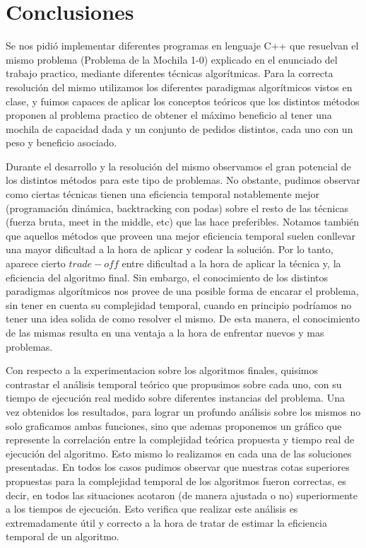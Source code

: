 \section{Conclusiones}
\label{sec:conclusiones}

Se nos pidió implementar diferentes programas en lenguaje C++ que resuelvan el mismo problema (Problema de la Mochila 1-0) explicado en el enunciado del trabajo practico, mediante diferentes técnicas algorítmicas.
Para la correcta resolución del mismo utilizamos los diferentes paradigmas algorítmicos vistos en clase, y fuimos capaces de aplicar los conceptos teóricos que los distintos métodos proponen al problema practico de obtener el máximo beneficio al tener una mochila de capacidad dada y un conjunto de pedidos distintos, cada uno con un peso y beneficio asociado.


Durante el desarrollo y la resolución del mismo observamos el gran potencial de los distintos métodos para este tipo de problemas. No obstante, pudimos observar como ciertas técnicas tienen una eficiencia temporal notablemente mejor (programación dinámica, backtracking con podas) sobre el resto de las técnicas (fuerza bruta, meet in the middle, etc) que las hace preferibles. Notamos también que aquellos métodos que proveen una mejor eficiencia temporal suelen conllevar una mayor dificultad a la hora de aplicar y codear la solución. Por lo tanto, aparece cierto $trade-off$ entre dificultad a la hora de aplicar la técnica y, la eficiencia del algoritmo final.
Sin embargo, el conocimiento de los distintos paradigmas algorítmicos nos provee de una posible forma de encarar el problema, sin tener en cuenta su complejidad temporal, cuando en principio podríamos no tener una idea solida de como resolver el mismo. De esta manera, el conocimiento de las mismas resulta en una ventaja a la hora de enfrentar nuevos y mas problemas.


Con respecto a la experimentacion sobre los algoritmos finales, quisimos contrastar el análisis temporal teórico que propusimos sobre cada uno, con su tiempo de ejecución real medido sobre diferentes instancias del problema.
Una vez obtenidos los resultados, para lograr un profundo análisis sobre los mismos no solo graficamos ambas funciones, sino que ademas proponemos un gráfico que represente la correlación entre la complejidad teórica propuesta y tiempo real de ejecución del algoritmo. Esto mismo lo realizamos en cada una de las soluciones presentadas.
En todos los casos pudimos observar que nuestras cotas superiores propuestas para la complejidad temporal de los algoritmos fueron correctas, es decir, en todos las situaciones acotaron (de manera ajustada o no) superiormente a los tiempos de ejecución. Esto verifica que realizar este análisis es extremadamente útil y correcto a la hora de tratar de estimar la eficiencia temporal de un algoritmo.